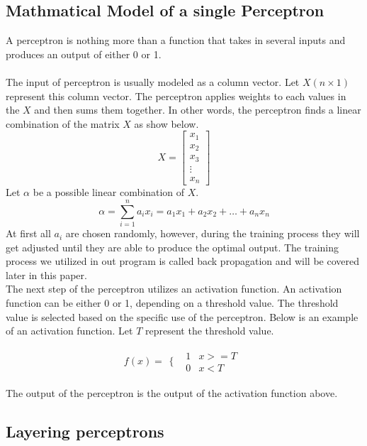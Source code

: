 
\subsection{Mathmatical Model of a single Perceptron}	
		
A perceptron is nothing more than a function that takes in several inputs and produces an output of either 0 or 1.\\ \\
The input of perceptron is usually modeled as a column vector. Let $X(n\times1)$ represent this column vector. The perceptron applies weights to each values in the $X$ and then sums them together. In other words, the perceptron finds a linear combination of the matrix $X$ as show below.
$$
X = 
\begin{bmatrix}
	x_1 \\
	x_2 \\
	x_3 \\
	\vdots \\
	x_n
\end{bmatrix} 
$$
Let $\alpha$ be a possible linear combination of $X$. 
$$
	\alpha = \sum_{i=1}^{n} a_ix_i = a_1x_1 + a_2x_2 + \dots + a_nx_n
$$
At first all $a_i$ are chosen randomly, however, during the training process they will get adjusted until they are able to produce the optimal output. The training process we utilized in out program is called back propagation and will be covered later in this paper.\\

The next step of the perceptron utilizes an activation function. An activation function can be either 0 or 1, depending on a threshold value. The threshold value is selected based on the specific use of the perceptron. Below is an example of an activation function. Let $T$ represent the threshold value.

$$f(x) = 
	\begin{array}{cc}
  	\{ & 
    \begin{array}{cc}
    	1 & x >= T \\
    	0 & x < T
    \end{array}
\end{array}
$$

The output of the perceptron is the output of the activation function above.

\subsection{Layering perceptrons}

